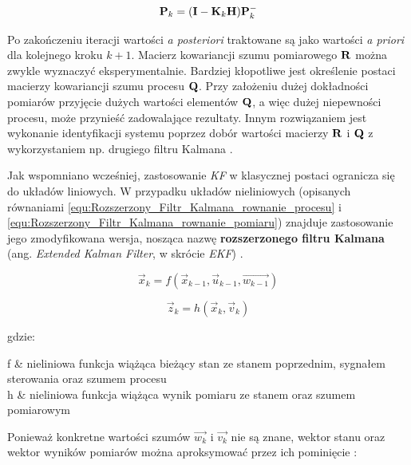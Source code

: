 \begin{equation}
\label{equ:Filtr_Kalmana_faza_korekcji_macierz_kowariancji_bledow}
	\mathbf{P}_k = (\mathbf{I} - \mathbf{K}_k \mathbf{H}) \mathbf{P}_k^-
\end{equation}

Po zakończeniu iteracji wartości \textit{a posteriori} traktowane są jako wartości \textit{a priori} dla kolejnego kroku $k+1$. Macierz kowariancji szumu pomiarowego $\mathbf{R}$ można zwykle wyznaczyć eksperymentalnie. Bardziej kłopotliwe jest określenie postaci macierzy kowariancji szumu procesu $\mathbf{Q}$. Przy założeniu dużej dokładności pomiarów przyjęcie dużych wartości elementów $\mathbf{Q}$, a więc dużej niepewności procesu, może przynieść zadowalające rezultaty. Innym rozwiązaniem jest wykonanie identyfikacji systemu poprzez dobór wartości macierzy $\mathbf{R}$ i $\mathbf{Q}$ z wykorzystaniem np. drugiego filtru Kalmana \cite{Welch1995}.

Jak wspomniano wcześniej, zastosowanie \textit{KF} w klasycznej postaci ogranicza się do układów liniowych. W przypadku układów nieliniowych (opisanych równaniami \ref{equ:Rozszerzony_Filtr_Kalmana_rownanie_procesu} i \ref{equ:Rozszerzony_Filtr_Kalmana_rownanie_pomiaru}) znajduje zastosowanie jego zmodyfikowana wersja, nosząca nazwę \textbf{rozszerzonego filtru Kalmana} (ang. \textit{Extended Kalman Filter}, w skrócie \textit{EKF}) \cite{Welch1995}.

\begin{equation}
\label{equ:Rozszerzony_Filtr_Kalmana_rownanie_procesu}
	\vec{x}_k = f(\vec{x}_{k-1}, \vec{u}_{k-1}, \vec{w_{k-1}})
\end{equation}

\begin{equation}
\label{equ:Rozszerzony_Filtr_Kalmana_rownanie_pomiaru}
	\vec{z}_k = h(\vec{x}_k, \vec{v}_k)
\end{equation}

\noindent
gdzie:

\begin{conditions}
	 f & nieliniowa funkcja wiążąca bieżący stan ze stanem poprzednim, sygnałem sterowania oraz szumem procesu \\
	 h & nieliniowa funkcja wiążąca wynik pomiaru ze stanem oraz szumem pomiarowym \\
\end{conditions}

Ponieważ konkretne wartości szumów $\vec{w_k}$ i $\vec{v_k}$ nie są znane, wektor stanu oraz wektor wyników pomiarów można aproksymować przez ich pominięcie \cite{Welch1995}:


